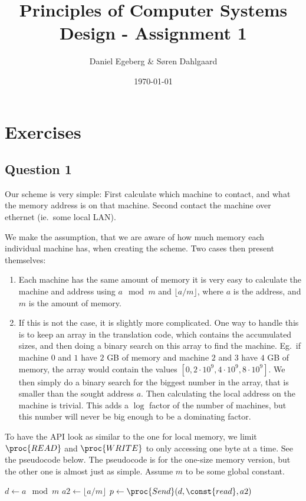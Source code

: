 \documentclass[a4paper,final]{article}
\title{Principles of Computer Systems Design - Assignment 1}
\date{\today}
\author{Daniel Egeberg \& Søren Dahlgaard}
\begin{document}
\maketitle

\section{Exercises}

\subsection*{Question 1}
Our scheme is very simple: First calculate which machine to contact, and what
the memory address is on that machine. Second contact the machine over ethernet
(ie.~some local LAN).

We make the assumption, that we are aware of how much memory each individual
machine has, when creating the scheme. Two cases then present themselves:
\begin{enumerate}
    \item Each machine has the same amount of memory it is very easy to
        calculate the machine and address using $a\mod m$ and
        $\lfloor a/m \rfloor$, where $a$ is the address, and $m$ is the amount
        of memory.
    \item If this is not the case, it is slightly more complicated. One way to
        handle this is to keep an array in the translation code, which contains
        the accumulated sizes, and then doing a binary search on this array to
        find the machine. Eg.~if machine $0$ and $1$ have $2$ GB of memory and
        machine $2$ and $3$ have $4$ GB of memory, the array would contain
        the values $[0, 2\cdot 10^9, 4\cdot 10^9, 8\cdot 10^9]$. We then simply
        do a binary search for the biggest number in the array, that is smaller
        than the sought address $a$. Then calculating the local address on the
        machine is trivial. This adds a $\log$ factor of the number of
        machines, but this number will never be big enough to be a dominating
        factor.
\end{enumerate}

To have the API look as similar to the one for local memory, we limit
$\proc{READ}$ and $\proc{WRITE}$ to only accessing one byte at a time. See the
pseudocode below. The pseudocode is for the one-size memory version, but the
other one is almost just as simple. Assume $m$ to be some global constant.

\begin{codebox}
    \li $d\gets a\mod m$
    \li $a2\gets \lfloor a/m \rfloor$
    \li $p\gets\proc{Send}(d, \const{read}, a2)$
\end{codebox}
\end{document}
